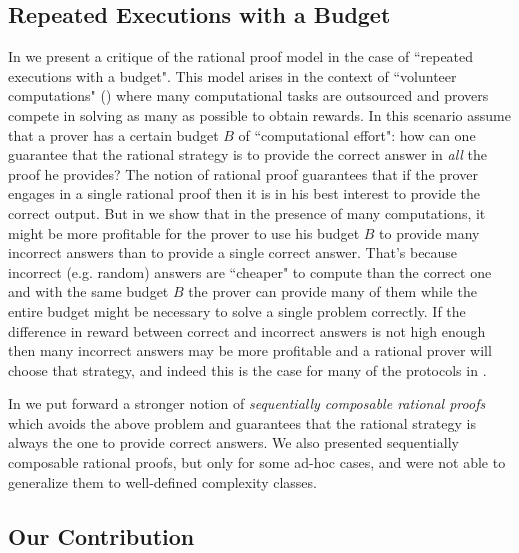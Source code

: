 \subsection{Repeated Executions with a Budget}
In \cite{cg15} 
we present a critique of the rational proof model in the case of ``repeated executions with a budget". This model arises in the context of ``volunteer computations" (\cite{seti,folding}) where many computational tasks are outsourced and provers compete in solving as many as possible to obtain rewards. In this scenario assume that a prover has a certain budget $B$ of ``computational effort": how can one  guarantee that the rational strategy is to provide the correct answer in {\em all} the proof he provides? The notion of rational proof guarantees that if the prover engages in a single rational proof then it is in his best interest to provide the correct output. But in \cite{cg15} 
we show that in the presence of many computations, it might be more profitable for the prover to use his budget $B$ to provide many incorrect answers than to provide a single correct answer. That's because incorrect (e.g. random) answers are ``cheaper" to compute than the correct one and with the same budget $B$ the prover can provide many of them while the entire budget might be necessary to solve a single problem correctly. If the difference in reward between correct and incorrect answers is not high enough then many incorrect answers may be more profitable and a rational prover will choose that strategy, and indeed this is the case for many of the protocols in \cite{am,am1,ratargs,ratsumchecks}. 

In \cite{cg15} we put forward a stronger notion of {\em sequentially composable rational proofs} which avoids the above problem and guarantees that the rational strategy is always the one to provide correct answers. We also presented sequentially composable rational proofs, but only for some ad-hoc cases, and were not able to generalize them to well-defined complexity classes. 


\subsection{Our Contribution}


